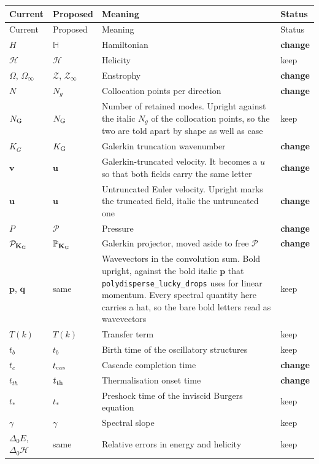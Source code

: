 \documentclass[11pt,a4paper]{article}
\newcommand{\mb}[1]{\mathbb{#1}}
\renewcommand{\vec}[1]{\boldsymbol{#1}}
\newcommand{\chg}{\textbf{change}}
\newcommand{\kp}{keep}
\begin{document}
\begin{longtable}{@{}p{3.1cm} p{3.1cm} p{8.6cm} p{1.6cm}@{}}
\toprule
Current & Proposed & Meaning & Status \\
\midrule
\endfirsthead
\toprule
Current & Proposed & Meaning & Status \\
\midrule
\endhead
$H$ & $\mb{H}$ & Hamiltonian & \chg \\
$\mathcal{H}$ & $\mathcal{H}$ & Helicity & \kp \\
$\Omega$, $\Omega_\infty$ & $\mathcal{Z}$, $\mathcal{Z}_\infty$ & Enstrophy & \chg \\
$N$ & $N_g$ & Collocation points per direction & \chg \\
$N_{\rm G}$ & $N_{\rm G}$ & Number of retained modes. Upright against the italic $N_g$ of the collocation points, so the two are told apart by shape as well as case & \kp \\
$K_G$ & $K_{\rm G}$ & Galerkin truncation wavenumber & \chg \\
$\mathbf{v}$ & $\mathbf{u}$ & Galerkin-truncated velocity. It becomes a $u$ so that both fields carry the same letter & \chg \\
$\mathbf{u}$ & $\vec{u}$ & Untruncated Euler velocity. Upright marks the truncated field, italic the untruncated one & \chg \\
$P$ & $\mathcal{P}$ & Pressure & \chg \\
$\mathcal{P}_{\mathbf{K}_{\rm G}}$ & $\mb{P}_{\mathbf{K}_{\rm G}}$ & Galerkin projector, moved aside to free $\mathcal{P}$ & \chg \\
$\mathbf{p}$, $\mathbf{q}$ & same & Wavevectors in the convolution sum. Bold upright, against the bold italic $\vec{p}$ that \texttt{polydisperse\_lucky\_drops} uses for linear momentum. Every spectral quantity here carries a hat, so the bare bold letters read as wavevectors & \kp \\
$T(k)$ & $T(k)$ & Transfer term & \kp \\
$t_b$ & $t_b$ & Birth time of the oscillatory structures & \kp \\
$t_c$ & $t_{\rm cas}$ & Cascade completion time & \chg \\
$t_{th}$ & $t_{\rm th}$ & Thermalisation onset time & \chg \\
$t_*$ & $t_*$ & Preshock time of the inviscid Burgers equation & \kp \\
$\gamma$ & $\gamma$ & Spectral slope & \kp \\
$\Delta_0 E$, $\Delta_0\mathcal{H}$ & same & Relative errors in energy and helicity & \kp \\

\end{longtable}
\end{document}
